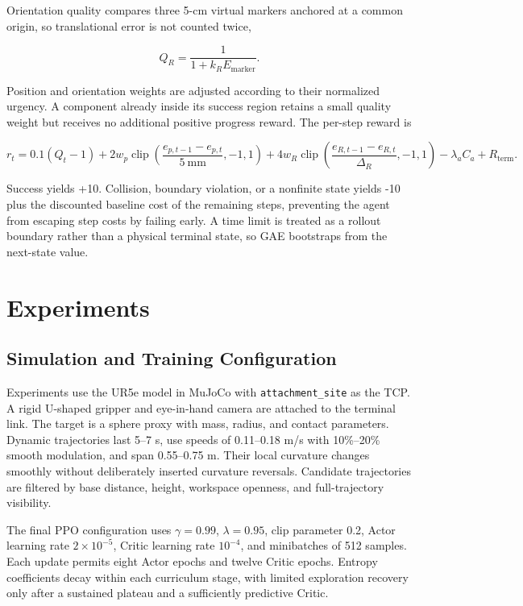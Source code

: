 \documentclass[conference]{IEEEtran}
\begin{document}
Orientation quality compares three 5-cm virtual markers anchored at a common origin, so translational error is not counted twice,

\begin{equation}
Q_R=\frac{1}{1+k_R E_{\mathrm{marker}}}.

\end{equation}

Position and orientation weights are adjusted according to their normalized urgency. A component already inside its success region retains a small quality weight but receives no additional positive progress reward. The per-step reward is

\begin{equation}
r_t=0.1(Q_t-1)
+2w_p\operatorname{clip}\!\left(\frac{e_{p,t-1}-e_{p,t}}{5\ \mathrm{mm}},-1,1\right)
+4w_R\operatorname{clip}\!\left(\frac{e_{R,t-1}-e_{R,t}}{\Delta_R},-1,1\right)
-\lambda_a C_a+R_{\mathrm{term}}.

\end{equation}

Success yields +10. Collision, boundary violation, or a nonfinite state yields -10 plus the discounted baseline cost of the remaining steps, preventing the agent from escaping step costs by failing early. A time limit is treated as a rollout boundary rather than a physical terminal state, so GAE bootstraps from the next-state value.

\section{Experiments}

\subsection{Simulation and Training Configuration}

Experiments use the UR5e model in MuJoCo \cite{ref9} with \texttt{attachment\_site} as the TCP. A rigid U-shaped gripper and eye-in-hand camera are attached to the terminal link. The target is a sphere proxy with mass, radius, and contact parameters. Dynamic trajectories last 5--7 s, use speeds of 0.11--0.18 m/s with 10\%--20\% smooth modulation, and span 0.55--0.75 m. Their local curvature changes smoothly without deliberately inserted curvature reversals. Candidate trajectories are filtered by base distance, height, workspace openness, and full-trajectory visibility.

The final PPO configuration uses \(\gamma=0.99\), \(\lambda=0.95\), clip parameter 0.2, Actor learning rate \(2\times10^{-5}\), Critic learning rate \(10^{-4}\), and minibatches of 512 samples. Each update permits eight Actor epochs and twelve Critic epochs. Entropy coefficients decay within each curriculum stage, with limited exploration recovery only after a sustained plateau and a sufficiently predictive Critic.
\end{document}
